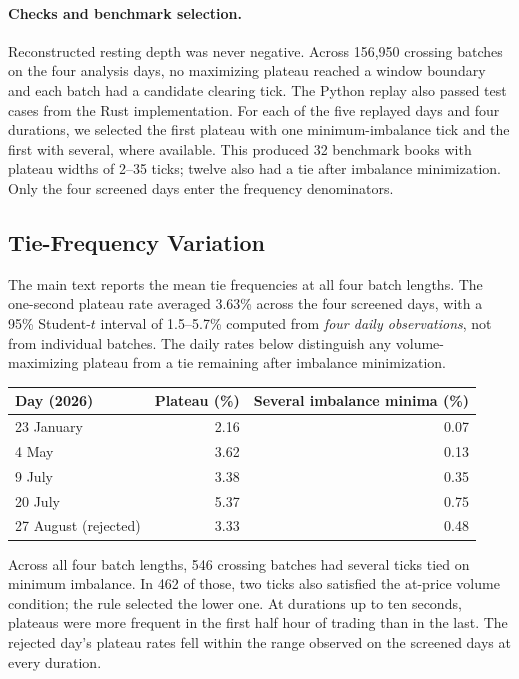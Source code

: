 \paragraph{Checks and benchmark selection.}
Reconstructed resting depth was never negative. Across 156,950 crossing batches on the four analysis days, no maximizing plateau reached a window boundary and each batch had a candidate clearing tick. The Python replay also passed test cases from the Rust implementation. For each of the five replayed days and four durations, we selected the first plateau with one minimum-imbalance tick and the first with several, where available. This produced 32 benchmark books with plateau widths of 2--35 ticks; twelve also had a tie after imbalance minimization. Only the four screened days enter the frequency denominators.

\subsection{Tie-Frequency Variation}
\label{app:zq-data-ties}

The main text reports the mean tie frequencies at all four batch lengths. The one-second plateau rate averaged 3.63\% across the four screened days, with a 95\% Student-$t$ interval of 1.5--5.7\% computed from \emph{four daily observations}, not from individual batches. The daily rates below distinguish any volume-maximizing plateau from a tie remaining after imbalance minimization.

\begin{center}
\small
\begin{tabular}{@{}lrr@{}}
\toprule
Day (2026) & Plateau (\%) & Several imbalance minima (\%) \\
\midrule
23 January & 2.16 & 0.07 \\
4 May & 3.62 & 0.13 \\
9 July & 3.38 & 0.35 \\
20 July & 5.37 & 0.75 \\
27 August (rejected) & 3.33 & 0.48 \\
\bottomrule
\end{tabular}
\end{center}

Across all four batch lengths, 546 crossing batches had several ticks tied on minimum imbalance. In 462 of those, two ticks also satisfied the at-price volume condition; the rule selected the lower one. At durations up to ten seconds, plateaus were more frequent in the first half hour of trading than in the last. The rejected day's plateau rates fell within the range observed on the screened days at every duration. %

